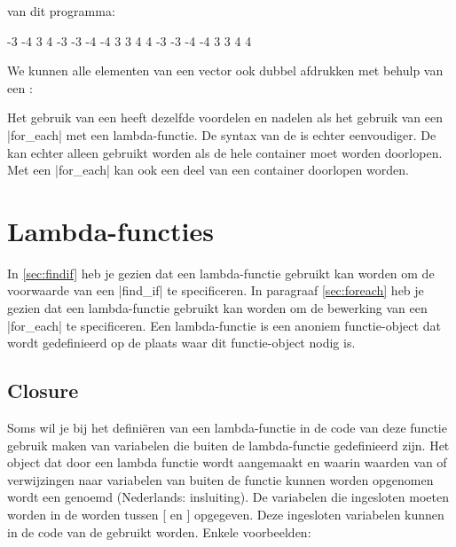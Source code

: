 \begin{cpplstShortInline}

 van dit programma:
\begin{coutput}
-3 -4 3 4
-3 -3 -4 -4 3 3 4 4
-3 -3 -4 -4 3 3 4 4
\end{coutput}

We kunnen alle elementen van een vector ook dubbel afdrukken met behulp van een :

Het gebruik van een  heeft dezelfde voordelen en nadelen als het gebruik van een |for_each| met een lambda\hyp{}functie.
De syntax van de  is echter eenvoudiger.
De  kan echter alleen gebruikt worden als de hele container moet worden doorlopen.
Met een |for_each| kan ook een deel van een container doorlopen worden.

\section{Lambda\hyp{}functies}
\label{sec:lambda}
In \cref{sec:findif} heb je gezien dat een lambda\hyp{}functie gebruikt kan worden om de voorwaarde van een |find_if| te specificeren.
In paragraaf \cref{sec:foreach} heb je gezien dat een lambda\hyp{}functie gebruikt kan worden om de bewerking van een |for_each| te specificeren.
Een lambda\hyp{}functie is een anoniem functie\hyp{}object dat wordt gedefinieerd op de plaats waar dit functie\hyp{}object nodig is.

\subsection{Closure}
\label{sec:closure}
Soms wil je bij het definiëren van een lambda\hyp{}functie in de code van deze functie gebruik maken van variabelen die buiten de lambda\hyp{}functie gedefinieerd zijn.
Het object dat door een lambda functie wordt aangemaakt en waarin waarden van of verwijzingen naar variabelen van buiten de functie kunnen worden opgenomen wordt een \emph{} genoemd (Nederlands: insluiting).
De variabelen die ingesloten moeten worden in de  worden tussen [ en ] opgegeven.
Deze ingesloten variabelen kunnen in de code van de  gebruikt worden.
Enkele voorbeelden:


\end{cpplstShortInline}
